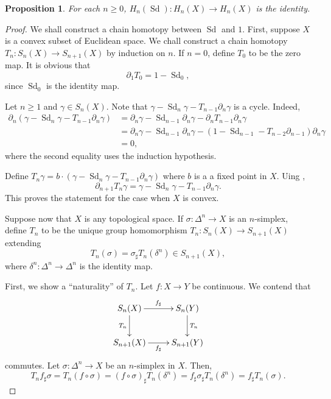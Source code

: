 \documentclass[10pt]{article}
\theoremstyle{thmstyle}
\newtheorem{proposition}[theorem]{Proposition}
\theoremstyle{defstyle}
\renewcommand{\ge}{\geqslant}
\newcommand{\Sd}{\operatorname{Sd}}
\begin{document}
\begin{proposition}
    For each $n\ge 0$, $H_n(\Sd): H_n(X)\to H_n(X)$ is the identity.
\end{proposition}
\begin{proof}
    We shall construct a chain homotopy between $\Sd$ and $1$. First, suppose $X$ is a convex subset of Euclidean space. We chall construct a chain homotopy $T_n: S_n(X)\to S_{n + 1}(X)$ by induction on $n$. If $n = 0$, define $T_0$ to be the zero map. It is obvious that 
    \begin{equation*}
        \partial_1T_0 = 1 - \Sd_0,
    \end{equation*}
    since $\Sd_0$ is the identity map.

    Let $n\ge 1$ and $\gamma\in S_n(X)$. Note that $\gamma - \Sd_n\gamma - T_{n - 1}\partial_n\gamma$ is a cycle. Indeed, 
    \begin{align*}
        \partial_n\left(\gamma - \Sd_n\gamma - T_{n - 1}\partial_n\gamma\right) &= \partial_n\gamma - \Sd_{n - 1}\partial_n\gamma - \partial_nT_{n - 1}\partial_n\gamma\\
        &= \partial_n\gamma - \Sd_{n - 1}\partial_n\gamma - \left(1 - \Sd_{n - 1} - T_{n - 2}\partial_{n - 1}\right)\partial_n\gamma\\
        &= 0,
    \end{align*}
    where the second equality uses the induction hypothesis.

    Define $T_n\gamma = b\cdot(\gamma - \Sd_{n}\gamma - T_{n - 1}\partial_n\gamma)$ where $b$ is a a fixed point in $X$. Uing ,
    \begin{equation*}
        \partial_{n + 1}T_n\gamma = \gamma - \Sd_n\gamma - T_{n - 1}\partial_n\gamma.
    \end{equation*}
    This proves the statement for the case when $X$ is convex.

    Suppose now that $X$ is any topological space. If $\sigma:\Delta^n\to X$ is an $n$-simplex, define $T_n$ to be the unique group homomorphism $T_n: S_n(X)\to S_{n + 1}(X)$ extending
    \begin{equation*}
        T_n(\sigma) = \sigma_\sharp T_n(\delta^n)\in S_{n + 1}(X),
    \end{equation*}
    where $\delta^n:\Delta^n\to\Delta^n$ is the identity map. 

    First, we show a ``naturality'' of $T_n$. Let $f: X\to Y$ be continuous. We contend that 
    \begin{equation*}
        \xymatrix {
            S_n(X)\ar[r]^{f_\sharp}\ar[d]_{T_n} & S_n(Y)\ar[d]^{T_n}\\
            S_{n + 1}(X)\ar[r]_{f_\sharp} & S_{n + 1}(Y)
        }
    \end{equation*}
    commutes. Let $\sigma:\Delta^n\to X$ be an $n$-simplex in $X$. Then,
    \begin{equation*}
        T_nf_\sharp\sigma = T_n(f\circ\sigma) = (f\circ\sigma)_\sharp T_n(\delta^n) = f_\sharp\sigma_\sharp T_n(\delta^n) = f_\sharp T_n(\sigma).
    \end{equation*}


\end{proof}
\end{document}
